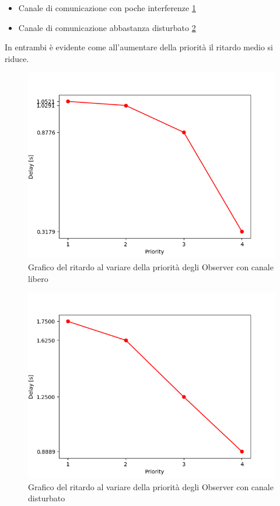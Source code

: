     \begin{itemize}
      \item Canale di comunicazione con poche interferenze \ref{fig:graficoRitardoLibero}
      \item Canale di comunicazione abbastanza disturbato \ref{fig:graficoRitardoDisturbato}
    \end{itemize}
    In entrambi è evidente come all'aumentare della priorità il ritardo medio si riduce.
    \begin{figure}
      \centering
      \includegraphics[scale = 0.75]{../Immagini/GraficoRitardoLibero.png}
      \caption{Grafico del ritardo al variare della priorità degli Observer con canale libero}
      \label{fig:graficoRitardoLibero}
    \end{figure}
    \begin{figure}
      \centering
      \includegraphics[scale = 0.75]{../Immagini/GraficoRitardoDisturbato.png}
      \caption{Grafico del ritardo al variare della priorità degli Observer con canale disturbato}
      \label{fig:graficoRitardoDisturbato}
    \end{figure}

